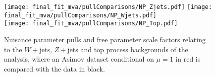 %
\begin{figure}[hb]
\centering
\texttt{[image: final\_fit\_mva/pullComparisons/NP\_Zjets.pdf]}
\texttt{[image: final\_fit\_mva/pullComparisons/NP\_Wjets.pdf]}\\
\texttt{[image: final\_fit\_mva/pullComparisons/NP\_Top.pdf]}\\
\caption{Nuisance parameter pulls and free parameter scale factors relating
  to the $W+$jets, $Z+$jets and top process backgrounds of the analysis, where
  an Asimov dataset conditional on $\mu=1$ in red is compared with the data in
  black.}
\label{fig:nppulls_012L_MVAVH_a} 
\end{figure}
%
%
